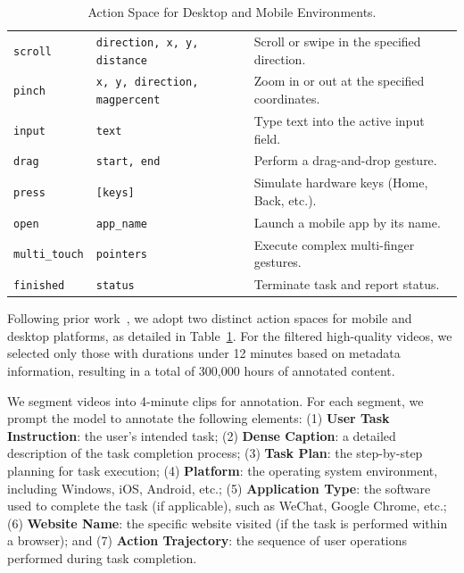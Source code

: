 \documentclass{llmxive}
\begin{document}
\begin{table}[t]
\begin{tabular}{l l p{8cm}}
\texttt{scroll}       & \texttt{direction, x, y, distance}  & Scroll or swipe in the specified direction. \\
\texttt{pinch}        & \texttt{x, y, direction, magpercent}   & Zoom in or out at the specified coordinates. \\
\texttt{input}        & \texttt{text}             & Type text into the active input field. \\
\texttt{drag}         & \texttt{start, end}       & Perform a drag-and-drop gesture. \\
\texttt{press}        & \texttt{[keys]}           & Simulate hardware keys (Home, Back, etc.). \\
\texttt{open}         & \texttt{app\_name}        & Launch a mobile app by its name.  \\
\texttt{multi\_touch} & \texttt{pointers}         & Execute complex multi-finger gestures. \\
\texttt{finished}     & \texttt{status}           & Terminate task and report status. \\
\bottomrule
\end{tabular}
\caption{Action Space for Desktop and Mobile Environments.}
\label{tab: action_space}
\end{table}

Following prior work~\citep{xie2024osworld, zhang2025agentcpm}, we adopt two distinct action spaces for mobile and desktop platforms, as detailed in Table~\ref{tab: action_space}. For the filtered high-quality videos, we selected only those with durations under 12 minutes based on metadata information, resulting in a total of 300,000 hours of annotated content.

We segment videos into 4-minute clips for annotation. For each segment, we prompt the model to annotate the following elements: (1) \textbf{User Task Instruction}: the user's intended task; (2) \textbf{Dense Caption}: a detailed description of the task completion process; (3) \textbf{Task Plan}: the step-by-step planning for task execution; (4) \textbf{Platform}: the operating system environment, including Windows, iOS, Android, etc.; (5) \textbf{Application Type}: the software used to complete the task (if applicable), such as WeChat, Google Chrome, etc.; (6) \textbf{Website Name}: the specific website visited (if the task is performed within a browser); and (7) \textbf{Action Trajectory}: the sequence of user operations performed during task completion.
\end{document}
